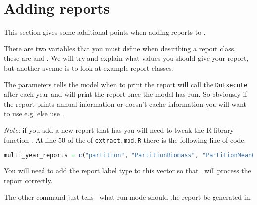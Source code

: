 \section{Adding reports\label{sec:reports}}

This section gives some additional points when adding reports to \CNAME. 

There are two variables that you must define when describing a report class, these are  and . We will try and explain what values you should give your report, but another avenue is to look at example report classes. 

The  parameters tells the model when to print the report  will call the \texttt{DoExecute} after each year and  will print the report once the model has run. So obviously if the report prints annual information or doesn't cache information you will want to use  e.g.  else use . 

\emph{Note:} if you add a new report that has   you will need to tweak the R-library function . At line 50 of the of \texttt{extract.mpd.R} there is the following line of code.   

\begin{lstlisting}[language=R]
multi_year_reports = c("partition", "PartitionBiomass", "PartitionMeanWeight")
\end{lstlisting}

You will need to add the report label type to this vector so that \R\ will process the report correctly.

The other command  just tells \CNAME\ what run-mode should the report be generated in.